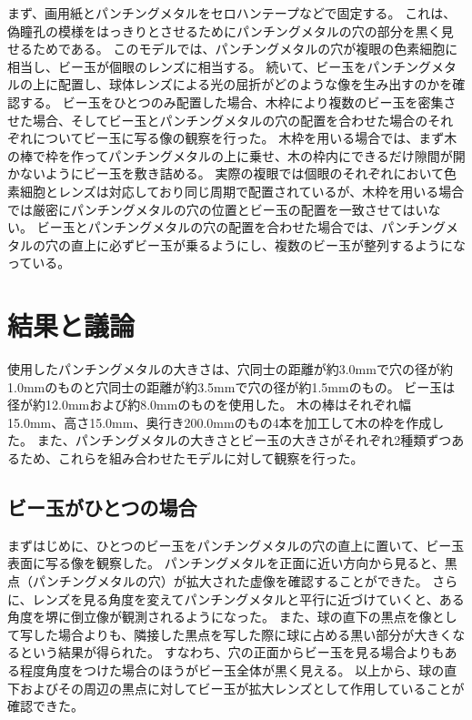 
\noindent
まず、画用紙とパンチングメタルをセロハンテープなどで固定する。
これは、偽瞳孔の模様をはっきりとさせるためにパンチングメタルの穴の部分を黒く見せるためである。
このモデルでは、パンチングメタルの穴が複眼の色素細胞に相当し、ビー玉が個眼のレンズに相当する。
続いて、ビー玉をパンチングメタルの上に配置し、球体レンズによる光の屈折がどのような像を生み出すのかを確認する。
ビー玉をひとつのみ配置した場合、木枠により複数のビー玉を密集させた場合、そしてビー玉とパンチングメタルの穴の配置を合わせた場合のそれぞれについてビー玉に写る像の観察を行った。
木枠を用いる場合では、まず木の棒で枠を作ってパンチングメタルの上に乗せ、木の枠内にできるだけ隙間が開かないようにビー玉を敷き詰める。
実際の複眼では個眼のそれぞれにおいて色素細胞とレンズは対応しており同じ周期で配置されているが、木枠を用いる場合では厳密にパンチングメタルの穴の位置とビー玉の配置を一致させてはいない。
ビー玉とパンチングメタルの穴の配置を合わせた場合では、パンチングメタルの穴の直上に必ずビー玉が乗るようにし、複数のビー玉が整列するようになっている。



\section{結果と議論}
\label{SExperimentResult}

使用したパンチングメタルの大きさは、穴同士の距離が約3.0mmで穴の径が約1.0mmのものと穴同士の距離が約3.5mmで穴の径が約1.5mmのもの。
ビー玉は径が約12.0mmおよび約8.0mmのものを使用した。
木の棒はそれぞれ幅15.0mm、高さ15.0mm、奥行き200.0mmのもの4本を加工して木の枠を作成した。
また、パンチングメタルの大きさとビー玉の大きさがそれぞれ2種類ずつあるため、これらを組み合わせたモデルに対して観察を行った。

\subsection{ビー玉がひとつの場合}
\label{SSOnemarble}
まずはじめに、ひとつのビー玉をパンチングメタルの穴の直上に置いて、ビー玉表面に写る像を観察した。
パンチングメタルを正面に近い方向から見ると、黒点（パンチングメタルの穴）が拡大された虚像を確認することができた\figref{}。
さらに、レンズを見る角度を変えてパンチングメタルと平行に近づけていくと、ある角度を堺に倒立像が観測されるようになった\figref{}。
また、球の直下の黒点を像として写した場合よりも、隣接した黒点を写した際に球に占める黒い部分が大きくなるという結果が得られた\figref{}。
すなわち、穴の正面からビー玉を見る場合よりもある程度角度をつけた場合のほうがビー玉全体が黒く見える。
以上から、球の直下およびその周辺の黒点に対してビー玉が拡大レンズとして作用していることが確認できた。

